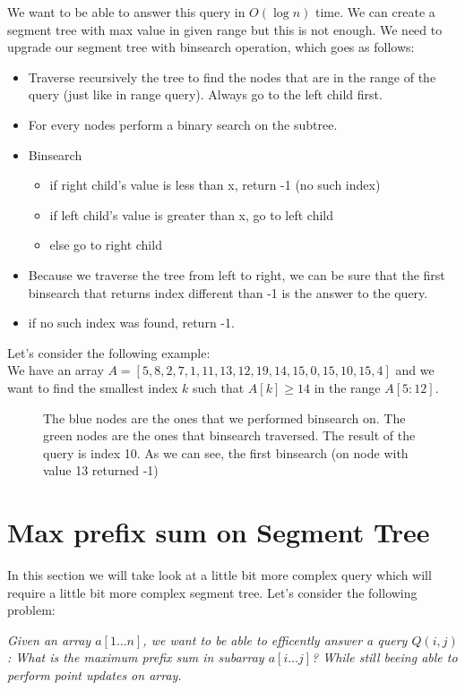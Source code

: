 \documentclass{article}
\begin{document}
We want to be able to answer this query in \(O(\log{n})\) time. We can create 
a segment tree with max value in given range but this is not enough. We need to upgrade our segment tree
with binsearch operation, which goes as follows:
\begin{itemize}
    \item Traverse recursively the tree to find the nodes that are in the range of the query (just like in range query). Always go to the left child first.
    \item For every nodes perform a binary search on the subtree.
    \item Binsearch 
        \begin{itemize}
            \item if right child's value is less than x, return -1 (no such index)
            \item if left child's value is greater than x, go to left child
            \item else go to right child
        \end{itemize}
    \item Because we traverse the tree from left to right, we can be sure that the first binsearch that returns index different than -1 is the answer to the query.
    \item if no such index was found, return -1.
\end{itemize}


\FloatBarrier
Let's consider the following example: \\
We have an array \(A = [5, 8, 2, 7, 1, 11, 13, 12, 19, 14, 15, 0, 15, 10, 15, 4]\) and we want to find the smallest index \(k\) such that \(A[k] \geq 14\) in the range \(A[5:12]\).

\begin{figure}[H]
    \centering
    
    \caption{The blue nodes are the ones that we performed binsearch on. The green nodes are the ones that binsearch traversed. The result of the query is index 10. As we can see, the first binsearch (on node with value 13 returned -1)}
    \label{fig:segment_tree_1}
\end{figure}

\section{Max prefix sum on Segment Tree}
In this section we will take look at a little bit more complex query which will require a little bit more complex segment tree.
Let's consider the following problem:
\begin{center}
    \textit{Given an array $a[1 \dots n]$, we want to be able to efficently answer a query $Q(i, j)$: What is the maximum prefix sum in subarray $a[i \dots j]$? 
    While still beeing able to perform point updates on array. }\\[1ex]
\end{center}
\end{document}
